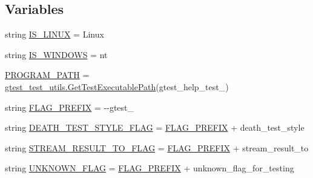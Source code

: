 \subsection*{Variables}
\begin{DoxyCompactItemize}
\item 
string \mbox{\hyperlink{namespacegoogletest-master_1_1googletest_1_1test_1_1gtest__help__test_a7bd6ac6a23ab3655efcc831651853871}{I\+S\+\_\+\+L\+I\+N\+UX}} = \textquotesingle{}Linux\textquotesingle{}
\item 
string \mbox{\hyperlink{namespacegoogletest-master_1_1googletest_1_1test_1_1gtest__help__test_af3876b8fb5ca29ccfb442e1165bd3727}{I\+S\+\_\+\+W\+I\+N\+D\+O\+WS}} = \textquotesingle{}nt\textquotesingle{}
\item 
\mbox{\hyperlink{namespacegoogletest-master_1_1googletest_1_1test_1_1gtest__help__test_add8a005508e33d868b28a8c7453cb8a1}{P\+R\+O\+G\+R\+A\+M\+\_\+\+P\+A\+TH}} = \mbox{\hyperlink{namespacegoogletest-master_1_1googletest_1_1test_1_1gtest__test__utils_a78bbc69ac699e750a6a29188caa643c4}{gtest\+\_\+test\+\_\+utils.\+Get\+Test\+Executable\+Path}}(\textquotesingle{}gtest\+\_\+help\+\_\+test\+\_\+\textquotesingle{})
\item 
string \mbox{\hyperlink{namespacegoogletest-master_1_1googletest_1_1test_1_1gtest__help__test_a611edeaab6f028e090dc444b288fa411}{F\+L\+A\+G\+\_\+\+P\+R\+E\+F\+IX}} = \textquotesingle{}-\/-\/gtest\+\_\+\textquotesingle{}
\item 
string \mbox{\hyperlink{namespacegoogletest-master_1_1googletest_1_1test_1_1gtest__help__test_aae60906470ac99a57eb801fcd1c89aed}{D\+E\+A\+T\+H\+\_\+\+T\+E\+S\+T\+\_\+\+S\+T\+Y\+L\+E\+\_\+\+F\+L\+AG}} = \mbox{\hyperlink{namespacegoogletest-master_1_1googletest_1_1test_1_1gtest__help__test_a611edeaab6f028e090dc444b288fa411}{F\+L\+A\+G\+\_\+\+P\+R\+E\+F\+IX}} + \textquotesingle{}death\+\_\+test\+\_\+style\textquotesingle{}
\item 
string \mbox{\hyperlink{namespacegoogletest-master_1_1googletest_1_1test_1_1gtest__help__test_a86cb984cf3daffe2cd48f7c693121aa6}{S\+T\+R\+E\+A\+M\+\_\+\+R\+E\+S\+U\+L\+T\+\_\+\+T\+O\+\_\+\+F\+L\+AG}} = \mbox{\hyperlink{namespacegoogletest-master_1_1googletest_1_1test_1_1gtest__help__test_a611edeaab6f028e090dc444b288fa411}{F\+L\+A\+G\+\_\+\+P\+R\+E\+F\+IX}} + \textquotesingle{}stream\+\_\+result\+\_\+to\textquotesingle{}
\item 
string \mbox{\hyperlink{namespacegoogletest-master_1_1googletest_1_1test_1_1gtest__help__test_a4ec0f16ca565eca3b1d53e7fc2fe7843}{U\+N\+K\+N\+O\+W\+N\+\_\+\+F\+L\+AG}} = \mbox{\hyperlink{namespacegoogletest-master_1_1googletest_1_1test_1_1gtest__help__test_a611edeaab6f028e090dc444b288fa411}{F\+L\+A\+G\+\_\+\+P\+R\+E\+F\+IX}} + \textquotesingle{}unknown\+\_\+flag\+\_\+for\+\_\+testing\textquotesingle{}

\end{DoxyCompactItemize}
